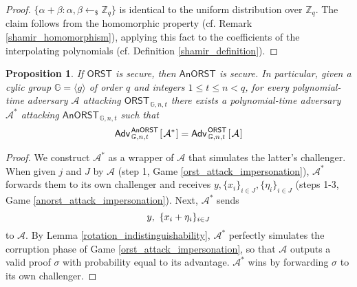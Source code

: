 \documentclass[psamsfonts, reqno]{amsart}
\newtheorem{prop}[thm]{Proposition}
\theoremstyle{definition}
\theoremstyle{remark}
\numberwithin{equation}{section}
\begin{document}
\begin{proof}
$\{\alpha + \beta: \alpha, \beta \leftarrow_\$ \mathbb{Z}_q\}$
is identical to the uniform distribution over $\mathbb{Z}_q$.
The claim follows from the homomorphic property
(cf. Remark \ref{shamir_homomorphism}), applying this fact
to the coefficients of the interpolating polynomials
(cf. Definition \ref{shamir_definition}).
\end{proof}

\begin{prop}\label{orst_security_implies_anorst_security}
If $\mathsf{ORST}$ is secure, then $\mathsf{AnORST}$ is secure.
In particular, given a cylic group
$\mathbb{G} = \langle g \rangle$
of order $q$ and integers $1 \le t \le n < q$,
for every polynomial-time adversary $\mathcal{A}$
attacking $\mathsf{ORST}_{\hspace{1pt}\mathbb{G}, n, t}$
there exists a polynomial-time adversary $\mathcal{A}^*$
attacking $\mathsf{AnORST}_{\hspace{1pt}\mathbb{G}, n, t}$
such that
\vspace{5pt}
\begin{equation}
\mathsf{Adv}
	_{\hspace{1pt}\mathbb{G},\hspace{0pt} n,\hspace{0pt} t}
	^{\hspace{1pt}\mathsf{AnORST}}
	\hspace{1pt}
		[\hspace{1pt}
			\mathcal{A}^*
		\hspace{0.5pt}]
=
\mathsf{Adv}
	_{\hspace{1pt}\mathbb{G},\hspace{0pt} n,\hspace{0pt} t}
	^{\hspace{1pt}\mathsf{ORST}}
	\hspace{1pt}
		[\hspace{1pt}
			\mathcal{A}
		\hspace{0.75pt}]
\vspace{5pt}
\end{equation}
\end{prop}

\begin{proof}
We construct $\mathcal{A}^*$ as a wrapper of $\mathcal{A}$
that simulates the latter's challenger.
When given $j$ and $J$ by $\mathcal{A}$
(step 1, Game \ref{orst_attack_impersonation}),
$\mathcal{A}^*$ forwards them to its own challenger
and receives
$
y, \{x_i\}_{i \in J}, \{\eta_i\}_{i \in J}
$
(steps 1-3, Game \ref{anorst_attack_impersonation}).
Next, $\mathcal{A}^*$ sends
\vspace{3pt}
\begin{equation*}
y,\ \{x_i + \eta_i\}_{i \in J}
\vspace{3pt}
\end{equation*}
to $\mathcal{A}$.
By Lemma \ref{rotation_indistinguishability},
$\mathcal{A}^*$ perfectly simulates the corruption phase
of Game \ref{orst_attack_impersonation},
so that $\mathcal{A}$ outputs a valid proof $\sigma$
with probability equal to its advantage.
$\mathcal{A}^*$ wins by forwarding $\sigma$
to its own challenger.
\end{proof}
\end{document}

